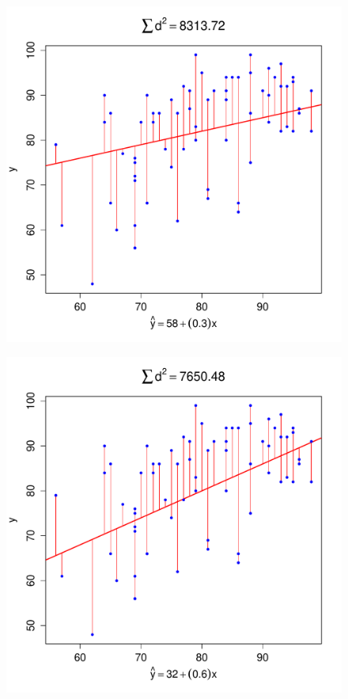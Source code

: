 \documentclass[handout]{beamer}
\begin{document}
\begin{frame}
\begin{figure}
	\includegraphics[scale = 0.48]{./images/SS3}
\end{figure}
\end{frame}
\begin{frame}
\begin{figure}
	\includegraphics[scale = 0.48]{./images/SS4}
\end{figure}
\end{frame}
\end{document}
